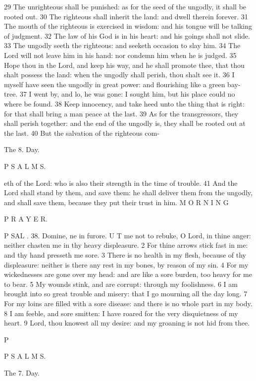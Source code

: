 29 The unrighteous shall be punished: as for the seed of the ungodly, it shall be rooted out. 30 The righteous shall inherit the land: and dwell therein forever. 31 The mouth of the righteous is exercised in wisdom: and his tongue will be talking of judgment. 32 The law of his God is in his heart: and his goings shall not slide. 33 The ungodly seeth the righteous: and seeketh occasion to slay him. 34 The Lord will not leave him in his hand: nor condemn him when he is judged. 35 Hope thou in the Lord, and keep his way, and he shall promote thee, that thou shalt possess the land: when the ungodly shall perish, thou shalt see it. 36 I myself have seen the ungodly in great power: and flourishing like a green bay-tree. 37 I went by, and lo, he was gone: I sought him, but his place could no where be found. 38 Keep innocency, and take heed unto the thing that is right: for that shall bring a man peace at the last. 39 As for the transgressors, they shall perish together: and the end of the ungodly is, they shall be rooted out at the last. 40 But the salvation of the righteous com-

The 8. Day.

P S A L M S.

eth of the Lord: who is also their strength in the time of trouble. 41 And the Lord shall stand by them, and save them: he shall deliver them from the ungodly, and shall save them, because they put their trust in him. M O R N I N G

P R A Y E R.

P SAL . 38. Domine, ne in furore. U T me not to rebuke, O Lord, in thine anger: neither chasten me in thy heavy displeasure. 2 For thine arrows stick fast in me: and thy hand presseth me sore. 3 There is no health in my flesh, because of thy displeasure: neither is there any rest in my bones, by reason of my sin. 4 For my wickednesses are gone over my head: and are like a sore burden, too heavy for me to bear. 5 My wounds stink, and are corrupt: through my foolishness. 6 I am brought into so great trouble and misery: that I go mourning all the day long. 7 For my loins are filled with a sore disease: and there is no whole part in my body. 8 I am feeble, and sore smitten: I have roared for the very disquietness of my heart. 9 Lord, thou knowest all my desire: and my groaning is not hid from thee.

P

P S A L M S.

The 7. Day.

